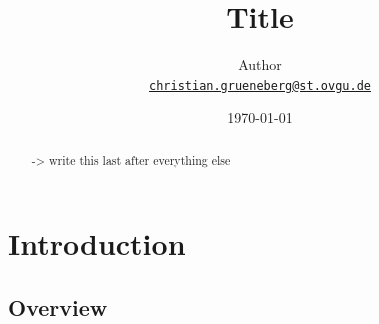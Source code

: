 \documentclass[
	12pt,
	a4paper,
	abstract,
	bibliography=totoc,
	chapterprefix,
	headings=openright,
	numbers=endperiod,
	parskip=half,
	twoside,
]{scrreprt}
\title{Title}
\author{
Author\\
{\large\href{mailto:christian.grueneberg@st.ovgu.de}{\nolinkurl{christian.grueneberg@st.ovgu.de}}}
}
\date{\today}
\begin{document}
{}

\maketitle

\begin{abstract}


-> write this last after everything else

\end{abstract}

\tableofcontents

\cleardoubleoddpage
{}

\chapter{Introduction}
\label{cha:introduction}


\section{Overview}

\end{document}
